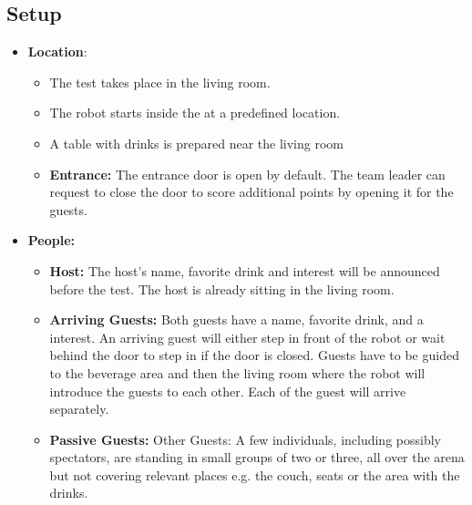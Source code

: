 \subsection*{Setup}
\begin{itemize}
	\item \textbf{Location}: 
	\begin{itemize}
	\item The test takes place in the living room.	
	\item The robot starts inside the \Arena{} at a predefined location.
	\item A table with drinks is prepared near the living room
	\item \textbf{Entrance:} The entrance door is open by default. The team leader can request to close the door to score additional points by opening it for the guests.
	\end{itemize}
	
	\item \textbf{People:} 
	\begin{itemize}
	\item \textbf{Host:} The host's name, favorite drink and interest will be announced before the test. The host is already sitting in the living room.

	\item \textbf{Arriving Guests:} Both guests have a name, favorite drink, and a interest. An arriving guest will either step in front of the robot or wait behind the door to step in if the door is closed. Guests have to be guided to the beverage area and then the living room where the robot will introduce the guests to each other. Each of the guest will arrive separately. 
	
	\item \textbf{Passive Guests:} Other Guests: A few individuals, including possibly spectators, are standing in small groups of two or three, all over the arena but not covering relevant places e.g. the couch, seats or the area with the drinks.
	\end{itemize}

\end{itemize}

